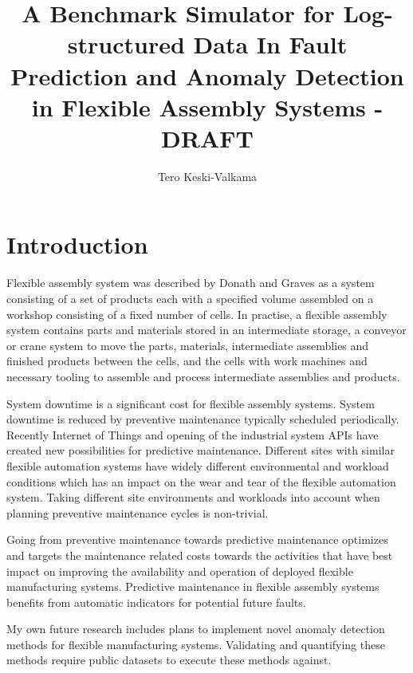 \documentclass[journal]{IEEEtran}
\title{A Benchmark Simulator for Log-structured Data In Fault Prediction and Anomaly Detection in Flexible Assembly Systems - DRAFT}
\author{Tero Keski-Valkama}
\begin{document}
\maketitle

\begin{abstract}

\end{abstract}

\begin{IEEEkeywords}
\end{IEEEkeywords}

\section{Introduction}
Flexible assembly system was described by Donath and Graves \cite{donath1988flexible} as a system consisting of a set of products each with a specified volume
assembled on a workshop consisting of a fixed number of cells. In practise, a flexible assembly system contains parts and materials stored in an intermediate storage,
a conveyor or crane system to move the parts, materials, intermediate assemblies and finished products between the cells, and the cells with work machines and necessary tooling
to assemble and process intermediate assemblies and products.

System downtime is a significant cost for flexible assembly systems. System downtime is reduced by preventive maintenance typically scheduled periodically.
Recently Internet of Things and opening of the industrial system APIs have created new possibilities for predictive maintenance. Different sites with similar
flexible automation systems have widely different environmental and workload conditions which has an impact on the wear and tear of the flexible automation system.
Taking different site environments and workloads into account when planning preventive maintenance cycles is non-trivial.

Going from preventive maintenance towards predictive maintenance optimizes and targets the maintenance related costs towards the activities that have best impact
on improving the availability and operation of deployed flexible manufacturing systems.
Predictive maintenance in flexible assembly systems benefits from automatic indicators for potential future faults.

My own future research includes plans to implement novel anomaly detection methods for flexible manufacturing systems. Validating and quantifying these methods
require public datasets to execute these methods against.
\end{document}
